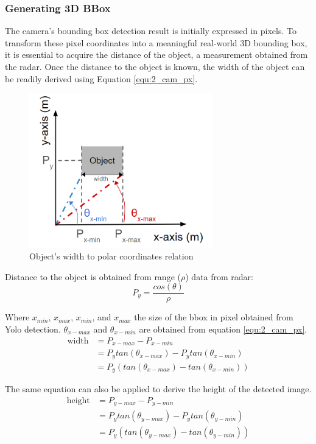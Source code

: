 \subsubsection{Generating 3D BBox}
The camera's bounding box detection result is initially expressed in pixels. 
To transform these pixel coordinates into a meaningful real-world 3D bounding box, 
it is essential to acquire the distance of the object, 
a measurement obtained from the radar. 
Once the distance to the object is known, the width of the object can be readily derived using Equation \ref{equ:2_cam_px}.
\begin{figure}[hpbt]
    \centering
    \includegraphics[width=8cm]{Figures/cart_width.png}%
    \caption{Object's width to polar coordinates relation}
    \label{fig:cart_width}
\end{figure}
Distance to the object is obtained from range ($\rho$) data from radar:
\begin{equation}\label{equ:2_py_rho}
    P_y=
    \frac
    {cos(\theta)}
    {\rho}
\end{equation}

Where $x_{min}$, $x_{max}$, $x_{min}$, and $x_{max}$ the size of the bbox in pixel obtained from Yolo detection. 
$\theta_{x-max}$ and $\theta_{x-min}$ are obtained from equation \ref{equ:2_cam_px}.
\begin{equation}\label{equ:2_cam_width}
    \begin{split}
    \text{width}&=P_{x-max}-P_{x-min}\\
                &=P_y tan(\theta_{x-max}) - P_y tan(\theta_{x-min})\\
                &=P_y (tan(\theta_{x-max}) - tan(\theta_{x-min}))
    \end{split}
\end{equation}

The same equation can also be applied to derive the height of the detected image. 
\begin{equation}\label{equ:2_cam_height}
    \begin{split}
    \text{height}&=P_{y-max}-P_{y-min}\\
                &=P_y tan(\theta_{y-max}) - P_y tan(\theta_{y-min})\\
                &=P_y (tan(\theta_{y-max}) - tan(\theta_{y-min}))
    \end{split}
\end{equation}






